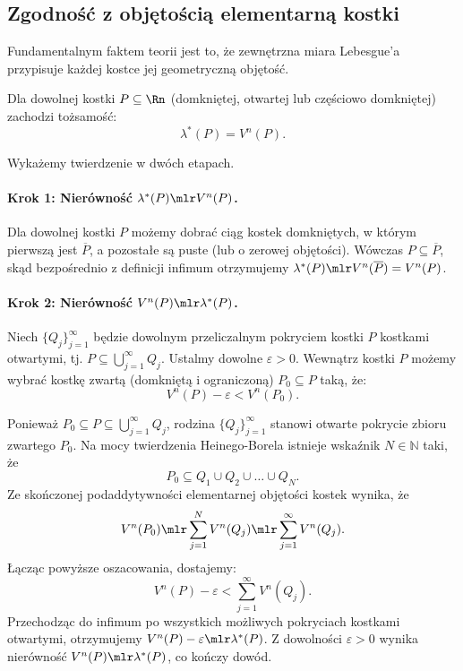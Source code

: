 \subsection{Zgodność z objętością elementarną kostki}
Fundamentalnym faktem teorii jest to, że zewnętrzna miara Lebesgue'a przypisuje każdej kostce jej geometryczną objętość.
\begin{tw} Dla dowolnej kostki $P \subseteq \Rn$ (domkniętej, otwartej lub częściowo domkniętej) zachodzi tożsamość: \begin{equation*} \lambda^{*}(P) = V^n(P). \end{equation*} \end{tw}
\begin{dow} Wykażemy twierdzenie w dwóch etapach.
    \paragraph{Krok 1: Nierówność $\lambda^{*}(P) \mlr V^n(P)$.} Dla dowolnej kostki $P$ możemy dobrać ciąg kostek domkniętych, w którym pierwszą jest $\overline{P}$, a pozostałe są puste (lub o zerowej objętości). Wówczas $P \subseteq  \overline{P}$, skąd bezpośrednio z definicji infimum otrzymujemy $\lambda^{*}(P) \mlr V^n(\overline{P}) = V^n(P)$.
    \paragraph{Krok 2: Nierówność $V^n(P) \mlr \lambda^{*}(P)$.} Niech $\{Q_j\}_{j=1}^\infty$ będzie dowolnym przeliczalnym pokryciem kostki $P$ kostkami otwartymi, tj. $P \subseteq \bigcup_{j=1}^\infty Q_j$. Ustalmy dowolne $\varepsilon > 0$. Wewnątrz kostki $P$ możemy wybrać kostkę zwartą (domkniętą i ograniczoną) $P_0 \subseteq  P$ taką, że:
    \begin{equation*}
        V^n(P) - \varepsilon < V^n(P_0).
    \end{equation*}

    Ponieważ $P_0 \subseteq  P \subseteq  \bigcup_{j=1}^\infty Q_j$, rodzina $\{Q_j\}_{j=1}^\infty$ stanowi otwarte pokrycie zbioru zwartego $P_0$. Na mocy twierdzenia Heinego-Borela istnieje wskaźnik $N \in \mathbb{N}$ taki, że \begin{equation*} P_0 \subseteq Q_1 \cup Q_2 \cup \dots \cup Q_N. \end{equation*} Ze skończonej podaddytywności elementarnej objętości kostek wynika, że \begin{equation*} V^n(P_0) \mlr \sum_{j=1}^N V^n(Q_j) \mlr \sum_{j=1}^\infty V^n(Q_j). \end{equation*} Łącząc powyższe oszacowania, dostajemy:
    \begin{equation*}
        V^n(P) - \varepsilon < \sum_{j=1}^\infty V^n(Q_j).
    \end{equation*} Przechodząc do infimum po wszystkich możliwych pokryciach kostkami otwartymi, otrzymujemy $V^n(P) - \varepsilon \mlr \lambda^{*}(P)$. Z dowolności $\varepsilon > 0$ wynika nierówność $V^n(P) \mlr \lambda^{*}(P)$, co kończy dowód.
\end{dow}

